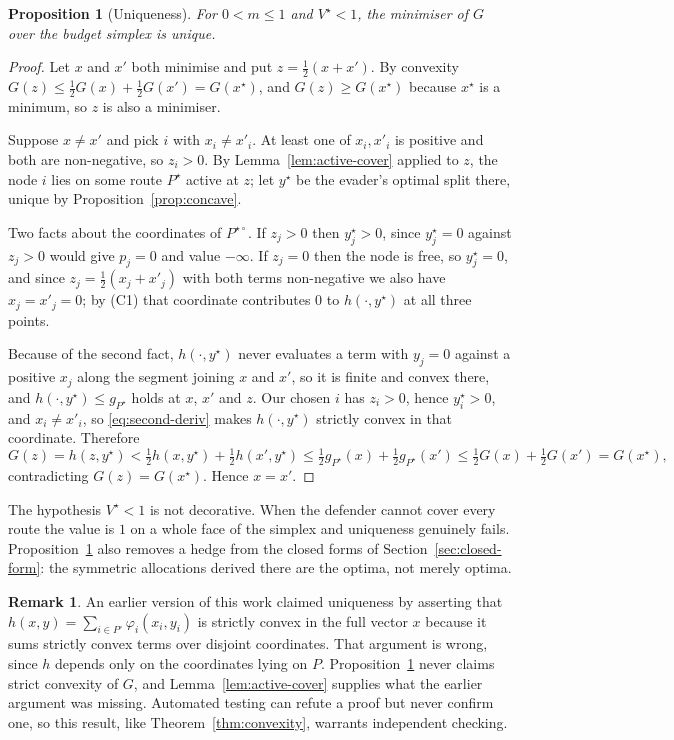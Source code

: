 \documentclass[10pt,a4paper,twoside]{article}
\theoremstyle{plain}
\newtheorem{proposition}[theorem]{Proposition}
\theoremstyle{definition}
\newtheorem{remark}[theorem]{Remark}
\begin{document}
\begin{proposition}[Uniqueness]
\label{prop:uniqueness}
For $0<m\le1$ and $V^{\star}<1$, the minimiser of $G$ over the budget simplex
is unique.
\end{proposition}
\begin{proof}
Let $x$ and $x'$ both minimise and put $z=\tfrac12(x+x')$. By convexity
$G(z)\le\tfrac12G(x)+\tfrac12G(x')=G(x^{\star})$, and $G(z)\ge G(x^{\star})$
because $x^{\star}$ is a minimum, so $z$ is also a minimiser.

Suppose $x\ne x'$ and pick $i$ with $x_i\ne x'_i$. At least one of $x_i,x'_i$
is positive and both are non-negative, so $z_i>0$. By
Lemma~\ref{lem:active-cover} applied to $z$, the node $i$ lies on some route
$P^{\star}$ active at $z$; let $y^{\star}$ be the evader's optimal split
there, unique by Proposition~\ref{prop:concave}.

Two facts about the coordinates of $P^{\star\circ}$. If $z_j>0$ then
$y^{\star}_j>0$, since $y^{\star}_j=0$ against $z_j>0$ would give $p_j=0$ and
value $-\infty$. If $z_j=0$ then the node is free, so $y^{\star}_j=0$, and
since $z_j=\tfrac12(x_j+x'_j)$ with both terms non-negative we also have
$x_j=x'_j=0$; by (C1) that coordinate contributes $0$ to $h(\cdot,y^{\star})$
at all three points.

Because of the second fact, $h(\cdot,y^{\star})$ never evaluates a term with
$y_j=0$ against a positive $x_j$ along the segment joining $x$ and $x'$, so
it is finite and convex there, and $h(\cdot,y^{\star})\le g_{P^{\star}}$
holds at $x$, $x'$ and $z$. Our chosen $i$ has $z_i>0$, hence
$y^{\star}_i>0$, and $x_i\ne x'_i$, so \eqref{eq:second-deriv} makes
$h(\cdot,y^{\star})$ strictly convex in that coordinate. Therefore
\[
  G(z)=h(z,y^{\star})<\tfrac12h(x,y^{\star})+\tfrac12h(x',y^{\star})
  \le\tfrac12 g_{P^{\star}}(x)+\tfrac12 g_{P^{\star}}(x')
  \le\tfrac12G(x)+\tfrac12G(x')=G(x^{\star}),
\]
contradicting $G(z)=G(x^{\star})$. Hence $x=x'$.
\end{proof}

The hypothesis $V^{\star}<1$ is not decorative. When the defender cannot
cover every route the value is $1$ on a whole face of the simplex and
uniqueness genuinely fails. Proposition~\ref{prop:uniqueness} also removes a
hedge from the closed forms of Section~\ref{sec:closed-form}: the symmetric
allocations derived there are the optima, not merely optima.

\begin{remark}
An earlier version of this work claimed uniqueness by asserting that
$h(x,y)=\sum_{i\in P^{\circ}}\varphi_i(x_i,y_i)$ is strictly convex in the
full vector $x$ because it sums strictly convex terms over disjoint
coordinates. That argument is wrong, since $h$ depends only on the
coordinates lying on $P$. Proposition~\ref{prop:uniqueness} never claims
strict convexity of $G$, and Lemma~\ref{lem:active-cover} supplies what the
earlier argument was missing. Automated testing can refute a proof but never
confirm one, so this result, like Theorem~\ref{thm:convexity}, warrants
independent checking.
\end{remark}
\end{document}
